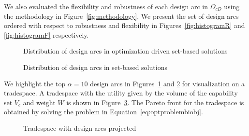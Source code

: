 We also evaluated the flexibility and robustness of each design arc in $\Omega_{cD}$ using the methodology in Figure~\ref{fig:methodology}. We present the set of design arcs ordered with respect to robustness and flexibility in Figures~\ref{fig:histogramR} and \ref{fig:histogramF} respectively.

\begin{figure}[h!]
	\centering
	 \hspace{0.1\textwidth}%
	 \hspace{0.1\textwidth}%
	\caption{Distribution of design arcs in optimization driven set-based solutions}
	\label{fig:histogramplotsSBD}
\end{figure}

\begin{figure}[h!]
	\centering
	 \hspace{0.1\textwidth}%
	 \hspace{0.1\textwidth}%
	\caption{Distribution of design arcs in set-based solutions}
	\label{fig:histogramplots}
\end{figure}

We highlight the top $\alpha = 10$ design arcs in Figures~\ref{fig:histogramplotsSBD} and \ref{fig:histogramplots} for visualization on a tradespace. A tradespace with the utility given by the volume of the capability set $V_c$ and weight $W$ is shown in Figure~\ref{fig:tradespaceSBD}. The Pareto front for the tradespace is obtained by solving the problem in Equation~\ref{eq:optproblembiobj}.

\begin{figure}[h!]
	\centering
	 \hspace{0.1\textwidth}%
	 \hspace{0.1\textwidth}%
	\caption{Tradespace with design arcs projected}
	\label{fig:tradespaceSBD}
\end{figure}

